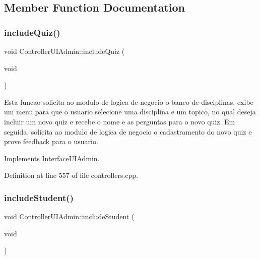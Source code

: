 \subsection{Member Function Documentation}
\mbox{\label{class_controller_u_i_admin_a9867df3728ad7e8c663a3b999e96a441}} 
\subsubsection{\texorpdfstring{include\+Quiz()}{includeQuiz()}}
{\footnotesize\ttfamily void Controller\+U\+I\+Admin\+::include\+Quiz (\begin{DoxyParamCaption}\item[{void}]{ }\end{DoxyParamCaption})\hspace{0.3cm}{\ttfamily [virtual]}}

Esta funcao solicita ao modulo de logica de negocio o banco de disciplinas, exibe um menu para que o usuario selecione uma disciplina e um topico, no qual deseja incluir um novo quiz e recebe o nome e as perguntas para o novo quiz. Em seguida, solicita ao modulo de logica de negocio o cadastramento do novo quiz e prove feedback para o usuario. 

Implements \hyperlink{class_interface_u_i_admin_a7a7964eb3ed3e6d4825d783433c9c7f1}{Interface\+U\+I\+Admin}.



Definition at line 557 of file controllers.\+cpp.

\mbox{\label{class_controller_u_i_admin_abe57cd3860f99ae9ee0023bdb9ccd6b1}} 
\subsubsection{\texorpdfstring{include\+Student()}{includeStudent()}}
{\footnotesize\ttfamily void Controller\+U\+I\+Admin\+::include\+Student (\begin{DoxyParamCaption}\item[{void}]{ }\end{DoxyParamCaption})\hspace{0.3cm}{\ttfamily [virtual]}}

